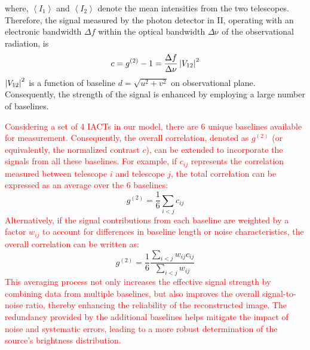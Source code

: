 where, $\left\langle I_1 \right\rangle$ and $\left\langle I_2 \right\rangle$ denote the mean intensities from the two telescopes. Therefore, the signal measured by the photon detector in II, operating with an electronic bandwidth $\Delta f$ within the optical bandwidth $\Delta {\mathrm {\nu}}$ of the observational radiation, is
\begin{equation}
	c = g^{(2)} - 1 = \frac{\Delta f}{\Delta \nu} \left|V_{12}\right|^2
	\label{eq:signal}
\end{equation}
$\left|V_{12}\right|^2$ is a function of baseline $d = \sqrt{u^2 + v^2}$ on observational plane. Consequently, the strength of the signal is enhanced by employing a large number of baselines.

\textcolor{red}{Considering a set of 4 IACTs in our model, there are 6 unique baselines available for measurement. Consequently, the overall correlation, denoted as $g^{(2)}$ (or equivalently, the normalized contrast $c$), can be extended to incorporate the signals from all these baselines. For example, if $c_{ij}$ represents the correlation measured between telescope $i$ and telescope $j$, the total correlation can be expressed as an average over the 6 baselines:}
\begin{equation}
g^{(2)} = \frac{1}{6}\sum_{i<j} c_{ij}
\end{equation}
\textcolor{red}{Alternatively, if the signal contributions from each baseline are weighted by a factor $w_{ij}$ to account for differences in baseline length or noise characteristics, the overall correlation can be written as:}
\begin{equation}
g^{(2)} = \frac{1}{6}\frac{\sum_{i<j} w_{ij} c_{ij}}{\sum_{i<j} w_{ij}}
\end{equation}
\textcolor{red}{This averaging process not only increases the effective signal strength by combining data from multiple baselines, but also improves the overall signal-to-noise ratio, thereby enhancing the reliability of the reconstructed image. The redundancy provided by the additional baselines helps mitigate the impact of noise and systematic errors, leading to a more robust determination of the source's brightness distribution.
}

